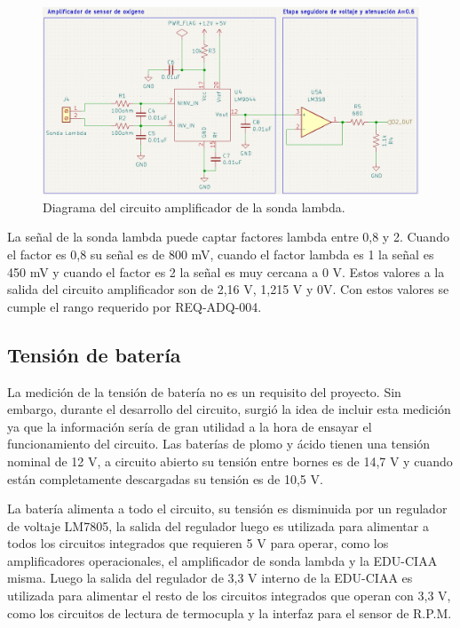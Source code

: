 \begin{figure}[htpb]
\centering
\includegraphics[width=\textwidth]{./Figures/ampli-o2.png}
\caption{Diagrama del circuito amplificador de la sonda lambda.}
\label{fig:circuito-o2}
\end{figure}

La señal de la sonda lambda puede captar factores lambda entre 0,8 y 2. Cuando el factor es 0,8 su señal es de 800 mV, cuando el factor lambda es 1 la señal es 450 mV y cuando el factor es 2 la señal es muy cercana a 0 V. Estos valores a la salida del circuito amplificador son de 2,16 V, 1,215 V y 0V. Con estos valores se cumple el rango requerido por REQ-ADQ-004.

\subsection{Tensión de batería}

La medición de la tensión de batería no es un requisito del proyecto. Sin embargo, durante el desarrollo del circuito, surgió la idea de incluir esta medición ya que la información sería de gran utilidad a la hora de ensayar el funcionamiento del circuito.
Las baterías de plomo y ácido tienen una tensión nominal de 12 V, a circuito abierto su tensión entre bornes es de 14,7 V y cuando están completamente descargadas su tensión es de 10,5 V.

La batería alimenta a todo el circuito, su tensión es disminuida por un regulador de voltaje LM7805, la salida del regulador luego es utilizada para alimentar a todos los circuitos integrados que requieren 5 V para operar, como los amplificadores operacionales, el amplificador de sonda lambda y la EDU-CIAA misma. Luego la salida del regulador de 3,3 V interno de la EDU-CIAA es utilizada para alimentar el resto de los circuitos integrados que operan con 3,3 V, como los circuitos de lectura de termocupla y la interfaz para el sensor de R.P.M.

